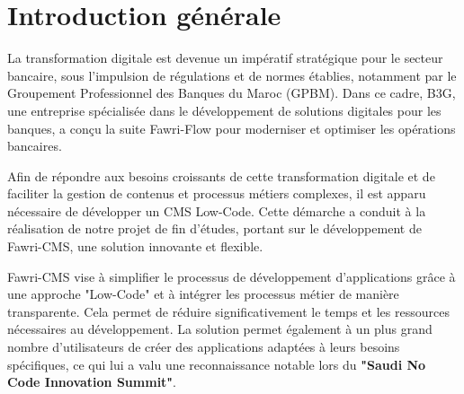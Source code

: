 \chapter*{Introduction générale}


\label{chap: Conclusion générale} 


\hspace{\parindent}La transformation digitale est devenue un impératif stratégique pour le secteur bancaire, sous l'impulsion de régulations et de normes établies, notamment par le Groupement Professionnel des Banques du Maroc (GPBM). Dans ce cadre, B3G, une entreprise spécialisée dans le développement de solutions digitales pour les banques, a conçu la suite Fawri-Flow pour moderniser et optimiser les opérations bancaires.

Afin de répondre aux besoins croissants de cette transformation digitale et de faciliter la gestion de contenus et processus métiers complexes, il est apparu nécessaire de développer un CMS Low-Code. Cette démarche a conduit à la réalisation de notre projet de fin d’études, portant sur le développement de Fawri-CMS, une solution innovante et flexible.

Fawri-CMS vise à simplifier le processus de développement d'applications grâce à une approche "Low-Code" et à intégrer les processus métier de manière transparente. Cela permet de réduire significativement le temps et les ressources nécessaires au développement. La solution permet également à un plus grand nombre d'utilisateurs de créer des applications adaptées à leurs besoins spécifiques, ce qui lui a valu une reconnaissance notable lors du \textbf{"Saudi No Code Innovation Summit"}.


